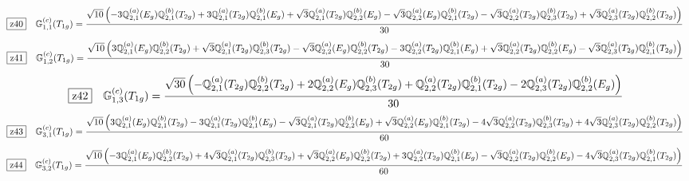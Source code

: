\documentclass[fleqn,10pt,landscape]{jsarticle}
\begin{document}
\begin{dmath*}
\hspace*{3mm}\fbox{z40}\quad \mathbb{G}_{1,1}^{(c)}(T_{1g})=\frac{\sqrt{10} \left(- 3 \mathbb{Q}_{2,1}^{(a)}(E_{g}) \mathbb{Q}_{2,1}^{(b)}(T_{2g}) + 3 \mathbb{Q}_{2,1}^{(a)}(T_{2g}) \mathbb{Q}_{2,1}^{(b)}(E_{g}) + \sqrt{3} \mathbb{Q}_{2,1}^{(a)}(T_{2g}) \mathbb{Q}_{2,2}^{(b)}(E_{g}) - \sqrt{3} \mathbb{Q}_{2,2}^{(a)}(E_{g}) \mathbb{Q}_{2,1}^{(b)}(T_{2g}) - \sqrt{3} \mathbb{Q}_{2,2}^{(a)}(T_{2g}) \mathbb{Q}_{2,3}^{(b)}(T_{2g}) + \sqrt{3} \mathbb{Q}_{2,3}^{(a)}(T_{2g}) \mathbb{Q}_{2,2}^{(b)}(T_{2g})\right)}{30}
\end{dmath*}
\begin{dmath*}
\hspace*{3mm}\fbox{z41}\quad \mathbb{G}_{1,2}^{(c)}(T_{1g})=\frac{\sqrt{10} \left(3 \mathbb{Q}_{2,1}^{(a)}(E_{g}) \mathbb{Q}_{2,2}^{(b)}(T_{2g}) + \sqrt{3} \mathbb{Q}_{2,1}^{(a)}(T_{2g}) \mathbb{Q}_{2,3}^{(b)}(T_{2g}) - \sqrt{3} \mathbb{Q}_{2,2}^{(a)}(E_{g}) \mathbb{Q}_{2,2}^{(b)}(T_{2g}) - 3 \mathbb{Q}_{2,2}^{(a)}(T_{2g}) \mathbb{Q}_{2,1}^{(b)}(E_{g}) + \sqrt{3} \mathbb{Q}_{2,2}^{(a)}(T_{2g}) \mathbb{Q}_{2,2}^{(b)}(E_{g}) - \sqrt{3} \mathbb{Q}_{2,3}^{(a)}(T_{2g}) \mathbb{Q}_{2,1}^{(b)}(T_{2g})\right)}{30}
\end{dmath*}
\begin{dmath*}
\hspace*{3mm}\fbox{z42}\quad \mathbb{G}_{1,3}^{(c)}(T_{1g})=\frac{\sqrt{30} \left(- \mathbb{Q}_{2,1}^{(a)}(T_{2g}) \mathbb{Q}_{2,2}^{(b)}(T_{2g}) + 2 \mathbb{Q}_{2,2}^{(a)}(E_{g}) \mathbb{Q}_{2,3}^{(b)}(T_{2g}) + \mathbb{Q}_{2,2}^{(a)}(T_{2g}) \mathbb{Q}_{2,1}^{(b)}(T_{2g}) - 2 \mathbb{Q}_{2,3}^{(a)}(T_{2g}) \mathbb{Q}_{2,2}^{(b)}(E_{g})\right)}{30}
\end{dmath*}
\begin{dmath*}
\hspace*{3mm}\fbox{z43}\quad \mathbb{G}_{3,1}^{(c)}(T_{1g})=\frac{\sqrt{10} \left(3 \mathbb{Q}_{2,1}^{(a)}(E_{g}) \mathbb{Q}_{2,1}^{(b)}(T_{2g}) - 3 \mathbb{Q}_{2,1}^{(a)}(T_{2g}) \mathbb{Q}_{2,1}^{(b)}(E_{g}) - \sqrt{3} \mathbb{Q}_{2,1}^{(a)}(T_{2g}) \mathbb{Q}_{2,2}^{(b)}(E_{g}) + \sqrt{3} \mathbb{Q}_{2,2}^{(a)}(E_{g}) \mathbb{Q}_{2,1}^{(b)}(T_{2g}) - 4 \sqrt{3} \mathbb{Q}_{2,2}^{(a)}(T_{2g}) \mathbb{Q}_{2,3}^{(b)}(T_{2g}) + 4 \sqrt{3} \mathbb{Q}_{2,3}^{(a)}(T_{2g}) \mathbb{Q}_{2,2}^{(b)}(T_{2g})\right)}{60}
\end{dmath*}
\begin{dmath*}
\hspace*{3mm}\fbox{z44}\quad \mathbb{G}_{3,2}^{(c)}(T_{1g})=\frac{\sqrt{10} \left(- 3 \mathbb{Q}_{2,1}^{(a)}(E_{g}) \mathbb{Q}_{2,2}^{(b)}(T_{2g}) + 4 \sqrt{3} \mathbb{Q}_{2,1}^{(a)}(T_{2g}) \mathbb{Q}_{2,3}^{(b)}(T_{2g}) + \sqrt{3} \mathbb{Q}_{2,2}^{(a)}(E_{g}) \mathbb{Q}_{2,2}^{(b)}(T_{2g}) + 3 \mathbb{Q}_{2,2}^{(a)}(T_{2g}) \mathbb{Q}_{2,1}^{(b)}(E_{g}) - \sqrt{3} \mathbb{Q}_{2,2}^{(a)}(T_{2g}) \mathbb{Q}_{2,2}^{(b)}(E_{g}) - 4 \sqrt{3} \mathbb{Q}_{2,3}^{(a)}(T_{2g}) \mathbb{Q}_{2,1}^{(b)}(T_{2g})\right)}{60}
\end{dmath*}
\end{document}
